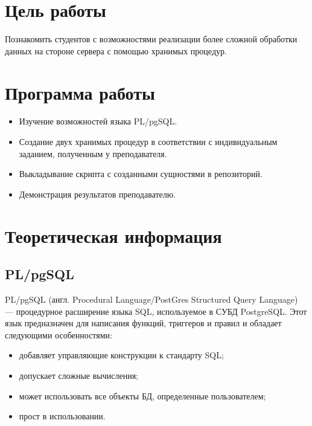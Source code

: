 







\section{Цель работы}
Познакомить студентов с возможностями реализации более сложной обработки данных на стороне сервера с помощью хранимых процедур.

\section{Программа работы}
\begin{itemize}
	\item Изучение возможностей языка PL/pgSQL.
	\item Создание двух хранимых процедур в соответствии с индивидуальным заданием, полученным у преподавателя.
	\item Выкладывание скрипта с созданными сущностями в репозиторий.
	\item Демонстрация результатов преподавателю.
\end{itemize}

\section{Теоретическая информация}
\subsection{PL/pgSQL}
PL/pgSQL (англ. Procedural Language/PostGres Structured Query Language) — процедурное расширение языка SQL, используемое в СУБД PostgreSQL. Этот язык предназначен для написания функций, триггеров и правил и обладает следующими особенностями:

\begin{itemize}
	\item добавляет управляющие конструкции к стандарту SQL;
	\item допускает сложные вычисления;
	\item может использовать все объекты БД, определенные пользователем;
	\item прост в использовании.
\end{itemize}

